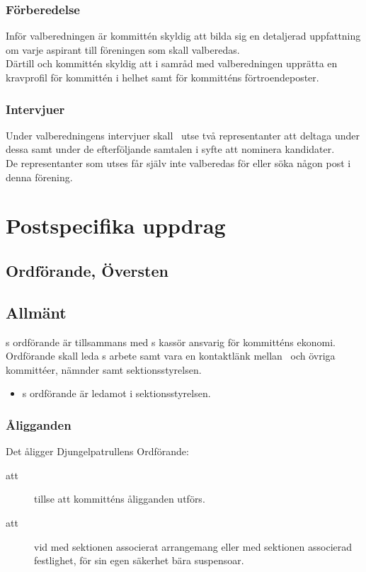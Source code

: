 \subsubsection{Förberedelse}
Inför valberedningen är kommittén skyldig att bilda sig en detaljerad uppfattning om varje aspirant till föreningen som skall valberedas.\\
Därtill och kommittén skyldig att i samråd med valberedningen upprätta en kravprofil för kommittén i helhet samt för kommitténs förtroendeposter.

\subsubsection{Intervjuer}
Under valberedningens intervjuer skall \forening \ utse två representanter att deltaga under dessa samt under de efterföljande samtalen i syfte att nominera kandidater.\\
De representanter som utses får själv inte valberedas för eller söka någon post i denna förening.

\section{Postspecifika uppdrag}

\subsection{Ordförande, Översten}
\subsection{Allmänt}
\forening s ordförande är tillsammans med \forening s kassör ansvarig för kommitténs ekonomi. Ordförande skall leda \forening s arbete samt vara en kontaktlänk mellan \forening \ och övriga kommittéer, nämnder samt sektionsstyrelsen. 
\begin{itemize}
\item \forening s ordförande är ledamot i sektionsstyrelsen.

\end{itemize}

\subsubsection{Åligganden}
Det åligger Djungelpatrullens Ordförande:
\begin{description}
\item[att] tillse att kommitténs åligganden utförs.

\item[att] vid med sektionen associerat arrangemang eller med sektionen associerad festlighet, för sin egen säkerhet bära suspensoar. 

\end{description}

